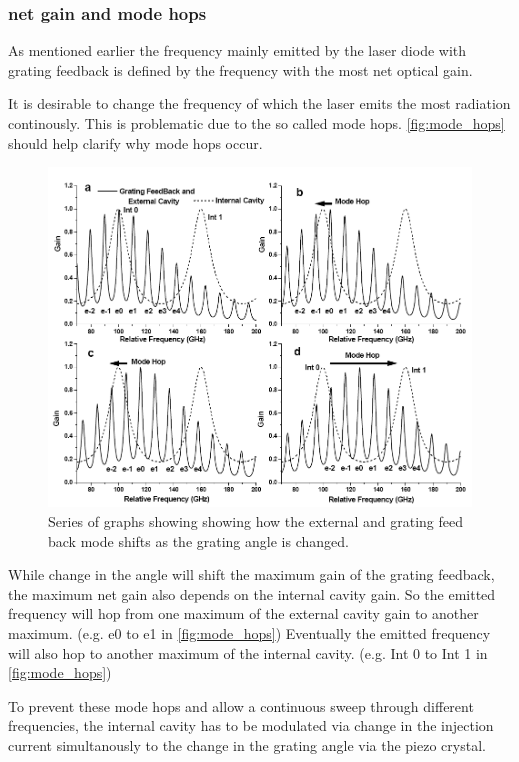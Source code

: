 \subsubsection{net gain and mode hops}
\label{sssec:net_gain}

As mentioned earlier the frequency mainly emitted by the laser diode with grating feedback is defined by the frequency with the most net optical gain.

It is desirable to change the frequency of which the laser emits the most radiation continously.
This is problematic due to the so called mode hops.
\autoref{fig:mode_hops} should help clarify why mode hops occur.

\begin{figure}
    \centering
    \includegraphics[width=\textwidth]{images/mode_hops.png}
    \caption{Series of graphs showing showing how the external and grating feed back mode shifts
    as the grating angle is changed. \cite{V60}}
    \label{fig:mode_hops}
\end{figure}

While change in the angle will shift the maximum gain of the grating feedback, 
the maximum net gain also depends on the internal cavity gain.
So the emitted frequency will hop from one maximum of the external cavity gain to another maximum. (e.g. e0 to e1 in \autoref{fig:mode_hops})
Eventually the emitted frequency will also hop to another maximum of the internal cavity. (e.g. Int 0 to Int 1 in \autoref{fig:mode_hops})

To prevent these mode hops and allow a continuous sweep through different frequencies, the internal cavity has to be modulated via change in the injection current
simultanously to the change in the grating angle via the piezo crystal.
